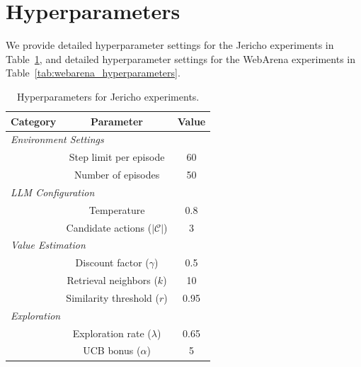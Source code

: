 \section{Hyperparameters}
\label{app:hyperparameters}


We provide detailed hyperparameter settings for the Jericho experiments in Table~\ref{tab:jericho_hyperparameters}, and detailed hyperparameter settings for the WebArena experiments in Table~\ref{tab:webarena_hyperparameters}.

\begin{table}[h]
\centering
\caption{Hyperparameters for Jericho experiments.}
\vskip 0.1in
\label{tab:jericho_hyperparameters}
\begin{tabular}{lcc}
\toprule
\textbf{Category} & \textbf{Parameter} & \textbf{Value} \\
\midrule
\multicolumn{3}{l}{\textit{Environment Settings}} \\
\addlinespace[2pt]
& Step limit per episode & 60 \\
& Number of episodes & 50 \\
\midrule
\multicolumn{3}{l}{\textit{LLM Configuration}} \\
\addlinespace[2pt]
& Temperature & 0.8 \\
& Candidate actions ($|\mathcal{C}|$) & 3 \\
\midrule
\multicolumn{3}{l}{\textit{Value Estimation}} \\
\addlinespace[2pt]
& Discount factor ($\gamma$) & 0.5 \\
& Retrieval neighbors ($k$) & 10 \\
& Similarity threshold ($r$) & 0.95 \\
\midrule
\multicolumn{3}{l}{\textit{Exploration}} \\
\addlinespace[2pt]
& Exploration rate ($\lambda$) & 0.65 \\
& UCB bonus ($\alpha$) & 5  \\
\bottomrule
\end{tabular}
\end{table}


